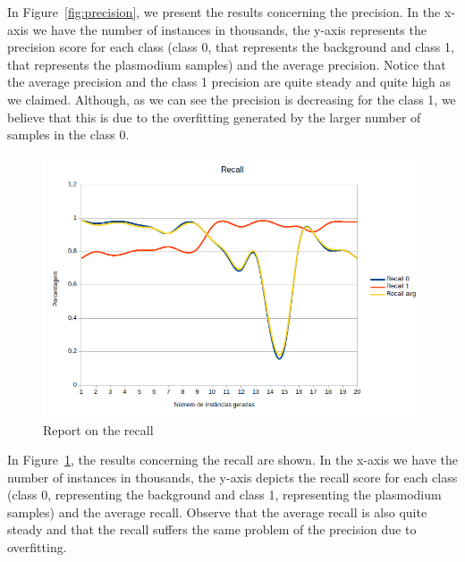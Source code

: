 In Figure~\ref{fig:precision}, we present the results concerning the precision. In the x-axis we have the number of instances in thousands, the y-axis represents the precision score for each class (class 0, that represents the background and class 1, that represents the plasmodium samples) and the average precision. Notice that the average precision and the class 1 precision are quite steady and quite high as we claimed. Although, as we can see the precision is decreasing for the class 1, we believe that this is due to the overfitting generated by the larger number of samples in the class 0. 

\begin{figure}[h]
\caption{Report on the recall}
\label{fig:recall}
\begin{center}
\includegraphics[scale=0.40]{./images/figura2.png} \end{center}
\end{figure}

In Figure~\ref{fig:recall}, the results concerning the recall are shown. In the x-axis we have the number of instances in thousands, the y-axis depicts the recall score for each class (class 0, representing the background and class 1, representing the plasmodium samples) and the average recall. Observe that the average recall is also quite steady and that the recall suffers the same problem of the precision due to overfitting.


